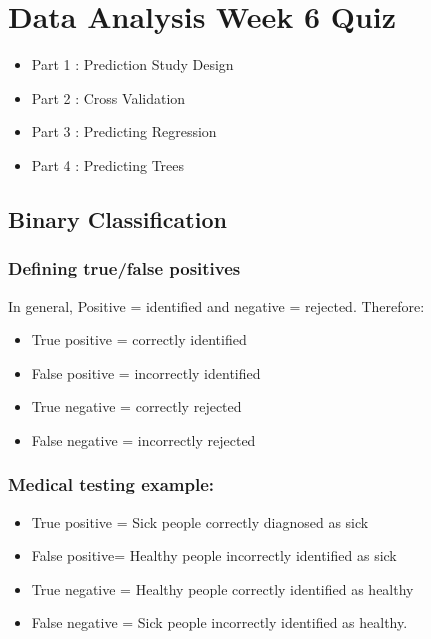 \documentclass[12pt]{article}
\begin{document}
\section*{Data Analysis Week 6 Quiz}
\begin{itemize}
\item Part 1 : Prediction Study Design
\item Part 2 : Cross Validation        
\item Part 3 : Predicting Regression        
\item Part 4 : Predicting Trees
\end{itemize}
\newpage
\subsection*{Binary Classification}
\subsubsection*{Defining true/false positives}
In general, Positive = identified and negative = rejected. Therefore:

\begin{itemize}
\item True positive = correctly identified

\item False positive = incorrectly identified

\item True negative = correctly rejected

\item False negative = incorrectly rejected
\end{itemize}
\subsubsection*{Medical testing example:}
\begin{itemize}
\item True positive = Sick people correctly diagnosed as sick

\item False positive= Healthy people incorrectly identified as sick

\item True negative = Healthy people correctly identified as healthy

\item False negative = Sick people incorrectly identified as healthy.
\end{itemize}
\newpage
\end{document}
